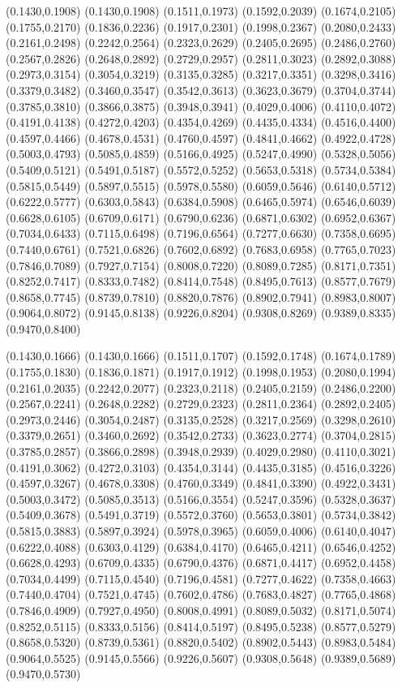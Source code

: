 \PST@Dashed(0.1430,0.1908)
(0.1430,0.1908)
(0.1511,0.1973)
(0.1592,0.2039)
(0.1674,0.2105)
(0.1755,0.2170)
(0.1836,0.2236)
(0.1917,0.2301)
(0.1998,0.2367)
(0.2080,0.2433)
(0.2161,0.2498)
(0.2242,0.2564)
(0.2323,0.2629)
(0.2405,0.2695)
(0.2486,0.2760)
(0.2567,0.2826)
(0.2648,0.2892)
(0.2729,0.2957)
(0.2811,0.3023)
(0.2892,0.3088)
(0.2973,0.3154)
(0.3054,0.3219)
(0.3135,0.3285)
(0.3217,0.3351)
(0.3298,0.3416)
(0.3379,0.3482)
(0.3460,0.3547)
(0.3542,0.3613)
(0.3623,0.3679)
(0.3704,0.3744)
(0.3785,0.3810)
(0.3866,0.3875)
(0.3948,0.3941)
(0.4029,0.4006)
(0.4110,0.4072)
(0.4191,0.4138)
(0.4272,0.4203)
(0.4354,0.4269)
(0.4435,0.4334)
(0.4516,0.4400)
(0.4597,0.4466)
(0.4678,0.4531)
(0.4760,0.4597)
(0.4841,0.4662)
(0.4922,0.4728)
(0.5003,0.4793)
(0.5085,0.4859)
(0.5166,0.4925)
(0.5247,0.4990)
(0.5328,0.5056)
(0.5409,0.5121)
(0.5491,0.5187)
(0.5572,0.5252)
(0.5653,0.5318)
(0.5734,0.5384)
(0.5815,0.5449)
(0.5897,0.5515)
(0.5978,0.5580)
(0.6059,0.5646)
(0.6140,0.5712)
(0.6222,0.5777)
(0.6303,0.5843)
(0.6384,0.5908)
(0.6465,0.5974)
(0.6546,0.6039)
(0.6628,0.6105)
(0.6709,0.6171)
(0.6790,0.6236)
(0.6871,0.6302)
(0.6952,0.6367)
(0.7034,0.6433)
(0.7115,0.6498)
(0.7196,0.6564)
(0.7277,0.6630)
(0.7358,0.6695)
(0.7440,0.6761)
(0.7521,0.6826)
(0.7602,0.6892)
(0.7683,0.6958)
(0.7765,0.7023)
(0.7846,0.7089)
(0.7927,0.7154)
(0.8008,0.7220)
(0.8089,0.7285)
(0.8171,0.7351)
(0.8252,0.7417)
(0.8333,0.7482)
(0.8414,0.7548)
(0.8495,0.7613)
(0.8577,0.7679)
(0.8658,0.7745)
(0.8739,0.7810)
(0.8820,0.7876)
(0.8902,0.7941)
(0.8983,0.8007)
(0.9064,0.8072)
(0.9145,0.8138)
(0.9226,0.8204)
(0.9308,0.8269)
(0.9389,0.8335)
(0.9470,0.8400)

\PST@Dotted(0.1430,0.1666)
(0.1430,0.1666)
(0.1511,0.1707)
(0.1592,0.1748)
(0.1674,0.1789)
(0.1755,0.1830)
(0.1836,0.1871)
(0.1917,0.1912)
(0.1998,0.1953)
(0.2080,0.1994)
(0.2161,0.2035)
(0.2242,0.2077)
(0.2323,0.2118)
(0.2405,0.2159)
(0.2486,0.2200)
(0.2567,0.2241)
(0.2648,0.2282)
(0.2729,0.2323)
(0.2811,0.2364)
(0.2892,0.2405)
(0.2973,0.2446)
(0.3054,0.2487)
(0.3135,0.2528)
(0.3217,0.2569)
(0.3298,0.2610)
(0.3379,0.2651)
(0.3460,0.2692)
(0.3542,0.2733)
(0.3623,0.2774)
(0.3704,0.2815)
(0.3785,0.2857)
(0.3866,0.2898)
(0.3948,0.2939)
(0.4029,0.2980)
(0.4110,0.3021)
(0.4191,0.3062)
(0.4272,0.3103)
(0.4354,0.3144)
(0.4435,0.3185)
(0.4516,0.3226)
(0.4597,0.3267)
(0.4678,0.3308)
(0.4760,0.3349)
(0.4841,0.3390)
(0.4922,0.3431)
(0.5003,0.3472)
(0.5085,0.3513)
(0.5166,0.3554)
(0.5247,0.3596)
(0.5328,0.3637)
(0.5409,0.3678)
(0.5491,0.3719)
(0.5572,0.3760)
(0.5653,0.3801)
(0.5734,0.3842)
(0.5815,0.3883)
(0.5897,0.3924)
(0.5978,0.3965)
(0.6059,0.4006)
(0.6140,0.4047)
(0.6222,0.4088)
(0.6303,0.4129)
(0.6384,0.4170)
(0.6465,0.4211)
(0.6546,0.4252)
(0.6628,0.4293)
(0.6709,0.4335)
(0.6790,0.4376)
(0.6871,0.4417)
(0.6952,0.4458)
(0.7034,0.4499)
(0.7115,0.4540)
(0.7196,0.4581)
(0.7277,0.4622)
(0.7358,0.4663)
(0.7440,0.4704)
(0.7521,0.4745)
(0.7602,0.4786)
(0.7683,0.4827)
(0.7765,0.4868)
(0.7846,0.4909)
(0.7927,0.4950)
(0.8008,0.4991)
(0.8089,0.5032)
(0.8171,0.5074)
(0.8252,0.5115)
(0.8333,0.5156)
(0.8414,0.5197)
(0.8495,0.5238)
(0.8577,0.5279)
(0.8658,0.5320)
(0.8739,0.5361)
(0.8820,0.5402)
(0.8902,0.5443)
(0.8983,0.5484)
(0.9064,0.5525)
(0.9145,0.5566)
(0.9226,0.5607)
(0.9308,0.5648)
(0.9389,0.5689)
(0.9470,0.5730)

